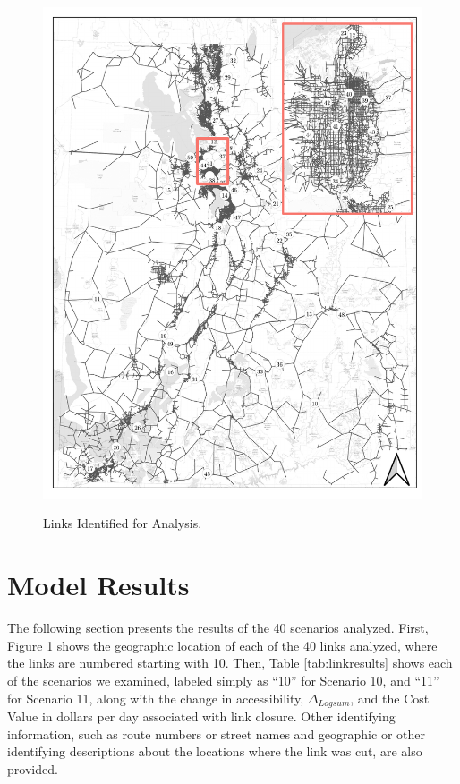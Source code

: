 \begin{figure}

{\centering \includegraphics[width=0.95\linewidth]{figures/chapter4/resiliency_links_map.pdf}}

\caption{Links Identified for Analysis.}
\label{fig:linksmap}
\end{figure}

\section{Model Results}

The following section presents the results of the 40 scenarios analyzed.
First, Figure \ref{fig:linksmap} shows the geographic location of each of the
40 links analyzed, where the links are numbered starting with 10. Then,
Table \ref{tab:linkresults} shows each of the scenarios we examined,
labeled simply as ``10'' for Scenario 10, and ``11'' for Scenario 11, along with the
change in accessibility, \(\Delta_{Logsum}\), and the Cost Value in dollars per day
associated with link closure. Other identifying information, such as route
numbers or street names and geographic or other identifying descriptions about
the locations where the link was cut, are also provided.

